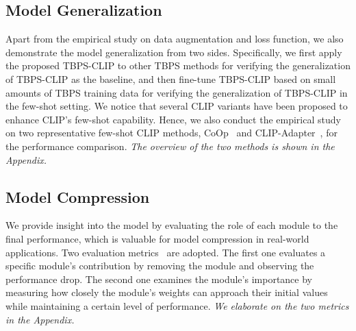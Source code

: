 \documentclass[letterpaper]{article} %
\begin{document}
\subsection{Model Generalization} \label{sec:3.5}
Apart from the empirical study on data augmentation and loss function, 
we also demonstrate the model generalization from two sides.
Specifically, we first apply the proposed TBPS-CLIP to other TBPS methods for verifying the generalization of TBPS-CLIP as the baseline, and then fine-tune TBPS-CLIP based on small amounts of TBPS training data for verifying the generalization of TBPS-CLIP in the few-shot setting. 
We notice that several CLIP variants have been proposed to enhance CLIP's few-shot capability.
Hence, we also conduct the empirical study on two representative few-shot CLIP methods, CoOp~\cite{zhou2022learning} and CLIP-Adapter~\cite{gao2021clip}, for the performance comparison.
\emph{The overview of the two methods is shown in the Appendix.}



\subsection{Model Compression}  \label{sec:3.4}

We provide insight into the model by evaluating the role of each module to the final performance, which is valuable for model compression in real-world applications.
Two evaluation metrics~\cite{wang2020rethinking} are adopted.
The first one evaluates a specific module's contribution by removing the module and observing the performance drop. 
The second one examines the module's importance by measuring how closely the module's weights can approach their initial values while maintaining a certain level of performance. 
\emph{We elaborate on the two metrics in the Appendix.}
\end{document}
